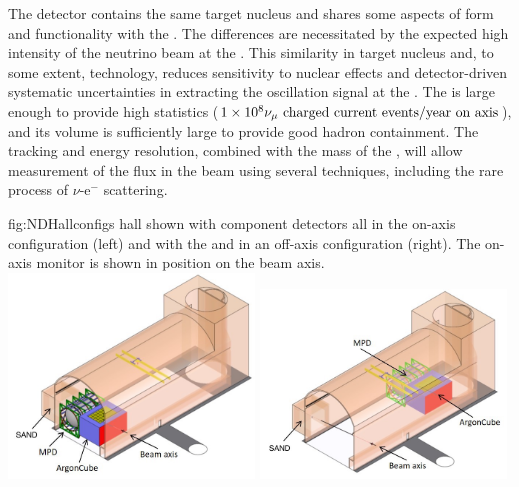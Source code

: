 The  detector contains the same target nucleus and shares some aspects of form and functionality with the . The differences are necessitated by the expected high intensity of the neutrino beam at the .  This similarity in target nucleus and, to some extent, technology, reduces sensitivity to nuclear effects and detector-driven systematic uncertainties in extracting the oscillation signal at the  . 
The   is large enough to provide high statistics ($\num{1e8} {\numu \text{ charged current events/year on axis}}$), and its volume is sufficiently large to provide good hadron containment.  The tracking and energy resolution, combined with the mass of the , will allow measurement of the flux in the beam using several techniques, including the rare process of $\nu$-e$^{-}$ scattering.

\begin{dunefigure}
{fig:NDHallconfigs}
{  hall shown with component detectors all in the on-axis configuration (left) and with the  and  in an off-axis configuration (right). The on-axis monitor  is shown in position on the beam axis. 
}
\includegraphics[width=0.49\textwidth]{graphics/NDHall_onaxis.jpg}
\includegraphics[width=0.49\textwidth]{graphics/NDHall_offaxis.jpg}
\end{dunefigure}

